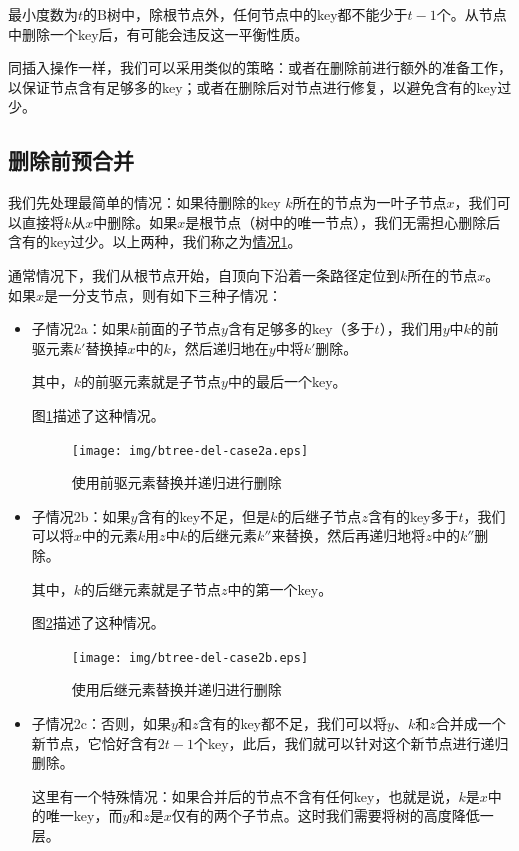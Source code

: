 \documentclass{ctexart}
\begin{document}
最小度数为$t$的B树中，除根节点外，任何节点中的key都不能少于$t-1$个。从节点中删除一个key后，有可能会违反这一平衡性质。

同插入操作一样，我们可以采用类似的策略：或者在删除前进行额外的准备工作，以保证节点含有足够多的key；或者在删除后对节点进行修复，以避免含有的key过少。


\subsection{删除前预合并}

我们先处理最简单的情况：如果待删除的key $k$所在的节点为一叶子节点$x$，我们可以直接将$k$从$x$中删除。如果$x$是根节点（树中的唯一节点），我们无需担心删除后含有的key过少。以上两种，我们称之为\underline{情况1}。

通常情况下，我们从根节点开始，自顶向下沿着一条路径定位到$k$所在的节点$x$。如果$x$是一分支节点，则有如下三种子情况：

\begin{itemize}
\item 子情况2a：如果$k$前面的子节点$y$含有足够多的key（多于$t$），我们用$y$中$k$的前驱元素$k'$替换掉$x$中的$k$，然后递归地在$y$中将$k'$删除。

其中，$k$的前驱元素就是子节点$y$中的最后一个key。

图\ref{fig:btree-del-case2a}描述了这种情况。

\begin{figure}[htbp]
  \centering
    \texttt{[image: img/btree-del-case2a.eps]}
    \caption{使用前驱元素替换并递归进行删除} \label{fig:btree-del-case2a}
\end{figure}

\item 子情况2b：如果$y$含有的key不足，但是$k$的后继子节点$z$含有的key多于$t$，我们可以将$x$中的元素$k$用$z$中$k$的后继元素$k''$来替换，然后再递归地将$z$中的$k''$删除。

其中，$k$的后继元素就是子节点$z$中的第一个key。

图\ref{fig:btree-del-case2b}描述了这种情况。

\begin{figure}[htbp]
  \centering
    \texttt{[image: img/btree-del-case2b.eps]}
    \caption{使用后继元素替换并递归进行删除} \label{fig:btree-del-case2b}
\end{figure}

\item 子情况2c：否则，如果$y$和$z$含有的key都不足，我们可以将$y$、$k$和$z$合并成一个新节点，它恰好含有$2t-1$个key，此后，我们就可以针对这个新节点进行递归删除。

这里有一个特殊情况：如果合并后的节点不含有任何key，也就是说，$k$是$x$中的唯一key，而$y$和$z$是$x$仅有的两个子节点。这时我们需要将树的高度降低一层。
\end{itemize}
\end{document}

